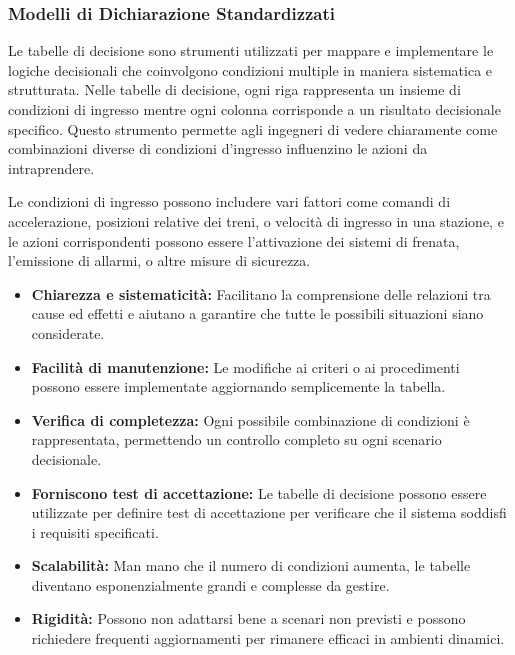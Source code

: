 \subsubsection{Modelli di Dichiarazione Standardizzati}
Le tabelle di decisione sono strumenti utilizzati per mappare e implementare le logiche decisionali che coinvolgono condizioni multiple in maniera sistematica e strutturata. Nelle tabelle di decisione, ogni riga rappresenta un insieme di condizioni di ingresso mentre ogni colonna corrisponde a un risultato decisionale specifico. Questo strumento permette agli ingegneri di vedere chiaramente come combinazioni diverse di condizioni d'ingresso influenzino le azioni da intraprendere.

Le condizioni di ingresso possono includere vari fattori come comandi di accelerazione, posizioni relative dei treni, o velocità di ingresso in una stazione, e le azioni corrispondenti possono essere l'attivazione dei sistemi di frenata, l'emissione di allarmi, o altre misure di sicurezza.

\begin{tcolorbox}[colback=green!5!white,colframe=green!75!black,title=Vantaggi delle Tabelle di Decisione]
\begin{itemize}
    \item \textbf{Chiarezza e sistematicità:} Facilitano la comprensione delle relazioni tra cause ed effetti e aiutano a garantire che tutte le possibili situazioni siano considerate.
    \item \textbf{Facilità di manutenzione:} Le modifiche ai criteri o ai procedimenti possono essere implementate aggiornando semplicemente la tabella.
    \item \textbf{Verifica di completezza:} Ogni possibile combinazione di condizioni
    è rappresentata, permettendo un controllo completo su ogni scenario decisionale.
    \item \textbf{Forniscono test di accettazione:} Le tabelle di decisione possono
    essere utilizzate per definire test di accettazione per verificare che il sistema
    soddisfi i requisiti specificati.
\end{itemize}
\end{tcolorbox}

\begin{tcolorbox}[colback=red!5!white,colframe=red!75!black,title=Svantaggi delle Tabelle di Decisione]
\begin{itemize}
    \item \textbf{Scalabilità:} Man mano che il numero di condizioni aumenta, le tabelle diventano esponenzialmente grandi e complesse da gestire.
    \item \textbf{Rigidità:} Possono non adattarsi bene a scenari non previsti e possono richiedere frequenti aggiornamenti per rimanere efficaci in ambienti dinamici.
\end{itemize}
\end{tcolorbox}
